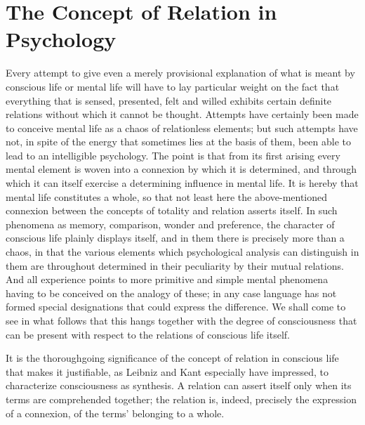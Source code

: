 \documentclass[12pt]{article}
\newcommand{\opage}[1]{\marginnote{\footnotesize\textit{[#1]}}}
\begin{document}

\section{The Concept of Relation in Psychology}
\label{sec:2}

Every attempt to give even a merely provisional explanation of what is meant
by conscious life or mental life will have to lay particular weight on the
fact that everything that is sensed, presented, felt and willed exhibits
certain definite relations without which it cannot be thought. Attempts have
certainly been made to conceive mental life as a chaos of relationless
elements; but such attempts have not, in spite of the energy that sometimes
lies at the basis of them, been able to lead to an intelligible psychology.
The point is that from its first arising every mental element is woven into
a connexion by which it is determined, and through which it can itself
exercise a determining influence in mental life. It is hereby that mental
life constitutes a whole, so that not least here the above-mentioned
connexion between the concepts of totality and relation asserts itself. In
such phenomena as memory, comparison, wonder and preference, the character
of conscious life plainly displays itself, and in them there is precisely
more than a chaos, in that the various \opage{17}elements which psychological analysis
can distinguish in them are throughout determined in their peculiarity by
their mutual relations. And all experience points to more primitive and
simple mental phenomena having to be conceived on the analogy of these; in
any case language has not formed special designations that could express the
difference. We shall come to see in what follows that this hangs together
with the degree of consciousness that can be present with respect to the
relations of conscious life itself.

It is the thoroughgoing significance of the concept of relation in conscious
life that makes it justifiable, as Leibniz and Kant especially have
impressed, to characterize consciousness as synthesis. A relation can assert
itself only when its terms are comprehended together; the relation is,
indeed, precisely the expression of a connexion, of the terms' belonging to
a whole.
\end{document}
